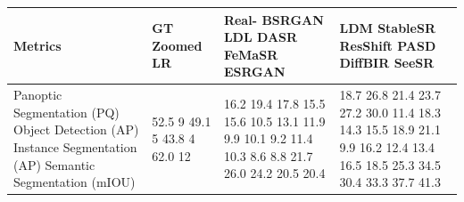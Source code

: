 \begin{tabular}{llll}
\toprule
Metrics & GT Zoomed LR & Real- BSRGAN LDL DASR FeMaSR ESRGAN & LDM StableSR ResShift PASD DiffBIR SeeSR \\
\midrule
Panoptic Segmentation (PQ) Object Detection (AP) Instance Segmentation (AP) Semantic Segmentation (mIOU) & 52.5 9 49.1 5 43.8 4 62.0 12 & 16.2 19.4 17.8 15.5 15.6 10.5 13.1 11.9 9.9 10.1 9.2 11.4 10.3 8.6 8.8 21.7 26.0 24.2 20.5 20.4 & 18.7 26.8 21.4 23.7 27.2 30.0 11.4 18.3 14.3 15.5 18.9 21.1 9.9 16.2 12.4 13.4 16.5 18.5 25.3 34.5 30.4 33.3 37.7 41.3 \\
\bottomrule
\end{tabular}
